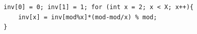 \begin{verbatim}
inv[0] = 0; inv[1] = 1; for (int x = 2; x < X; x++){
    inv[x] = inv[mod%x]*(mod-mod/x) % mod;
}
\end{verbatim}